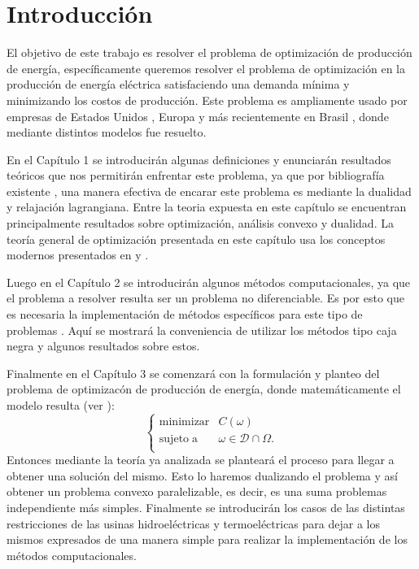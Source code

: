\documentclass[a4paper,12pt]{report}
\newcommand{\om}{\omega}
\begin{document}
\tableofcontents

\chapter*{Introducci\'on}

El objetivo de este trabajo es resolver el problema de optimizaci\'on de producci\'on de energ\'ia, espec\'ificamente queremos resolver el problema de optimizaci\'on en la producci\'on de energ\'ia el\'ectrica satisfaciendo una demanda m\'inima y minimizando los costos de producci\'on. Este problema es ampliamente usado por empresas de Estados Unidos \cite{gollmer2000unit}, Europa \cite{blondel1991} y m\'as recientemente en Brasil \cite{BelSouPinSag:03}, donde mediante distintos modelos fue resuelto. 

En el Cap\'itulo 1 se introducir\'an algunas definiciones y enunciar\'an resultados te\'oricos que nos permitir\'an enfrentar este problema, ya que por bibliograf\'ia existente \cite{BonGilLemSag:NO:06}, una manera efectiva de encarar este problema es mediante la dualidad y relajaci\'on lagrangiana. Entre la teoria expuesta en este cap\'itulo se encuentran principalmente resultados sobre optimizaci\'on, an\'alisis convexo y dualidad. La teor\'ia general de optimizaci\'on presentada en este cap\'itulo usa los conceptos modernos presentados en \cite{IzmSol:Otim1} y \cite{RocWet:VA:97}.

Luego en el Cap\'itulo 2 se introducir\'an algunos m\'etodos computacionales, ya que el problema a resolver resulta ser un problema no diferenciable. Es por esto que es necesaria la implementaci\'on de m\'etodos espec\'ificos para este tipo de problemas \cite{Sag:CIMPA}. Aqu\'i se mostrar\'a la conveniencia de utilizar los m\'etodos tipo caja negra y algunos resultados sobre estos.

Finalmente en el Cap\'itulo 3 se comenzar\'a con la formulaci\'on y planteo del problema de optimizac\'on de producci\'on de energ\'ia, donde matem\'aticamente el modelo resulta (ver \cite{BelSouPinSag:03}):
\begin{equation}
\left\{
 \begin{array}{rc}
  \mathrm{minimizar}&C(\omega)\\
  \mathrm{sujeto\;a}&\om\in\mathcal{D}\cap\Omega.\\
 \end{array}
\right.
\end{equation}
Entonces mediante la teor\'ia ya analizada se plantear\'a el proceso para llegar a obtener una soluci\'on del mismo. Esto lo haremos dualizando el problema y as\'i obtener un problema convexo paralelizable, es decir, es una suma problemas independiente m\'as simples. Finalmente se introducir\'an los casos de las distintas restricciones de las usinas hidroel\'ectricas y termoel\'ectricas para dejar a los mismos expresados de una manera simple para realizar la implementaci\'on de los m\'etodos computacionales.
\end{document}
